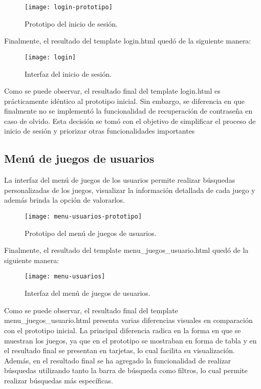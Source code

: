 \begin{figure}[htb]
\centering
\texttt{[image: login-prototipo]}
\caption{Prototipo del inicio de sesión.}
\label{fig:login-prototipo}
\end{figure}

Finalmente, el resultado del template login.html quedó de la siguiente manera:
\newpage
\begin{figure}[htb]
\centering
\texttt{[image: login]}
\caption{Interfaz del inicio de sesión.}
\label{fig:login}
\end{figure}

Como se puede observar, el resultado final del template login.html es prácticamente idéntico al prototipo inicial. Sin embargo, se diferencia en que finalmente no se implementó la funcionalidad de recuperación de contraseña en caso de olvido. Esta decisión se tomó con el objetivo de simplificar el proceso de inicio de sesión y priorizar otras funcionalidades importantes

\subsection{Menú de juegos de usuarios}
La interfaz del menú de juegos de los usuarios permite realizar búsquedas personalizadas de los juegos, visualizar la información detallada de cada juego y además brinda la opción de valorarlos.

\begin{figure}[htb]
\centering
\texttt{[image: menu-usuarios-prototipo]}
\caption{Prototipo del menú de juegos de usuarios.}
\label{fig:menu-usuarios-prototipo}
\end{figure}

\newpage
Finalmente, el resultado del template menu\_juegos\_usuario.html quedó de la siguiente manera:

\begin{figure}[htb]
\centering
\texttt{[image: menu-usuarios]}
\caption{Interfaz del menú de juegos de usuarios.}
\label{fig:menu-usuarios}
\end{figure}

Como se puede observar, el resultado final del template menu\_juegos\_usuario.html presenta varias diferencias visuales en comparación con el prototipo inicial. La principal diferencia radica en la forma en que se muestran los juegos, ya que en el prototipo se mostraban en forma de tabla y en el resultado final se presentan en tarjetas, lo cual facilita su visualización. Además, en el resultado final se ha agregado la funcionalidad de realizar búsquedas utilizando tanto la barra de búsqueda como filtros, lo cual permite realizar búsquedas más específicas.

